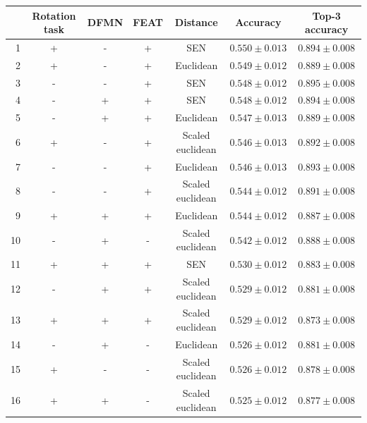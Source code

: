 \documentclass[a4paper, 12pt]{report}
\begin{document}
\begin{table}[h!]
\begin{adjustbox}{center}
\begin{tabular}{| r | c c c c | c |  c | }
\hline
    & Rotation task   & DFMN   & FEAT   & Distance         & Accuracy         & Top-3 accuracy   \\
\hline
  1 & +               & -      & +      & SEN              & $0.550 \pm 0.013$ & $0.894 \pm 0.008$ \\
\hline
  2 & +               & -      & +      & Euclidean        & $0.549 \pm 0.012$ & $0.889 \pm 0.008$ \\
\hline
  3 & -               & -      & +      & SEN              & $0.548 \pm 0.012$ & $0.895 \pm 0.008$ \\
\hline
  4 & -               & +      & +      & SEN              & $0.548 \pm 0.012$ & $0.894 \pm 0.008$ \\
\hline
  5 & -               & +      & +      & Euclidean        & $0.547 \pm 0.013$ & $0.889 \pm 0.008$ \\
\hline
  6 & +               & -      & +      & Scaled euclidean & $0.546 \pm 0.013$ & $0.892 \pm 0.008$ \\
\hline
  7 & -               & -      & +      & Euclidean        & $0.546 \pm 0.013$ & $0.893 \pm 0.008$ \\
\hline
  8 & -               & -      & +      & Scaled euclidean & $0.544 \pm 0.012$ & $0.891 \pm 0.008$ \\
\hline
  9 & +               & +      & +      & Euclidean        & $0.544 \pm 0.012$ & $0.887 \pm 0.008$ \\
\hline
 10 & -               & +      & -      & Scaled euclidean & $0.542 \pm 0.012$ & $0.888 \pm 0.008$ \\
\hline
 11 & +               & +      & +      & SEN              & $0.530 \pm 0.012$ & $0.883 \pm 0.008$ \\
\hline
 12 & -               & +      & +      & Scaled euclidean & $0.529 \pm 0.012$ & $0.881 \pm 0.008$ \\
\hline
 13 & +               & +      & +      & Scaled euclidean & $0.529 \pm 0.012$ & $0.873 \pm 0.008$ \\
\hline
 14 & -               & +      & -      & Euclidean        & $0.526 \pm 0.012$ & $0.881 \pm 0.008$ \\
\hline
 15 & +               & -      & -      & Scaled euclidean & $0.526 \pm 0.012$ & $0.878 \pm 0.008$ \\
\hline
 16 & +               & +      & -      & Scaled euclidean & $0.525 \pm 0.012$ & $0.877 \pm 0.008$ \\

\end{tabular}
\end{adjustbox}
\end{table}
\end{document}
